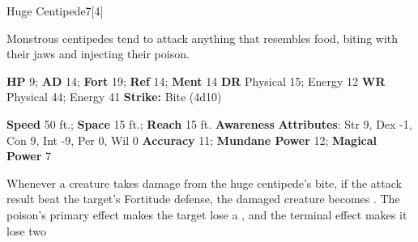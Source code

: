   \begin{monsection}{Huge Centipede}{7}[4]
    \vspace{-1em}\vspace{-1em}
    \vspace{0em}

    
    Monstrous centipedes tend to attack anything that resembles food, biting with their jaws and injecting their poison.
  

    \begin{spellcontent}
      \begin{spelltargetinginfo}
        \pari \textbf{HP} 9;
          \textbf{AD} 14;
          \textbf{Fort} 19;
          \textbf{Ref} 14;
          \textbf{Ment} 14
        \pari \textbf{DR} Physical 15; Energy 12
        \pari \textbf{WR} Physical 44; Energy 41
        \pari \textbf{Strike:}
            Bite  (4d10)
      \end{spelltargetinginfo}
    \end{spellcontent}
    \begin{monsterfooter}
      \pari \textbf{Speed} 50 ft.;
        \textbf{Space} 15 ft.;
        \textbf{Reach} 15 ft.
      \pari \textbf{Awareness} 
      \pari \textbf{Attributes}:
        Str 9, Dex -1,
        Con 9, Int -9,
        Per 0, Wil 0
      \pari \textbf{Accuracy} 11;
        \textbf{Mundane Power} 12;
      \textbf{Magical Power} 7
    \end{monsterfooter}
  \end{monsection}
    Whenever a creature takes damage from the huge centipede's bite,
      if the attack result beat the target's Fortitude defense,
      the damaged creature becomes .
    The poison's primary effect makes the target lose a , and the terminal effect makes it lose two 
  
